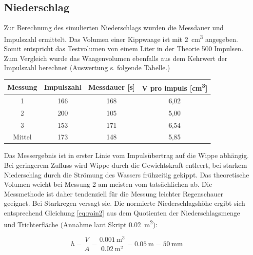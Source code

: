		
\subsection{Niederschlag}
Zur Berechnung des simulierten Niederschlags wurden die Messdauer und Impulszahl ermittelt. Das Volumen einer Kippwaage ist mit \SI{2}{\cubic\centi\meter} angegeben. Somit entspricht das Testvolumen von einem Liter in der Theorie 500 Impulsen. Zum Vergleich wurde das Waagenvolumen ebenfalls aus dem Kehrwert der Impulszahl berechnet (Auswertung s. folgende Tabelle.)

 \begin{center}
 	\begin{tabular}{c|c|c|c}
 		\label{tab:rain}
 		\textbf{Messung} & \textbf{Impulszahl} & \textbf{Messdauer} [s] & \textbf{V pro impuls} [\si{\cubic\centi\meter}]\\
 		\hline
 		1 & 166 & 168  & 6,02\\
 		2 & 200 & 105  & 5,00\\
 		3 & 153 & 171  & 6,54\\
 		Mittel & 173 & 148  & 5,85
 	\end{tabular}
 \end{center}

Das Messergebnis ist in erster Linie vom Impulsübertrag auf die Wippe abhängig. Bei geringerem Zufluss wird Wippe durch die Gewichtskraft entleert, bei starkem Niederschlag durch die Strömung des Wassers frühzeitig gekippt. Das theoretische Volumen weicht bei Messung 2 am meisten vom tatsächlichen ab. Die Messmethode ist daher tendenziell für die Messung leichter Regenschauer geeignet. Bei Starkregen versagt sie. 
Die normierte Niederschlagshöhe ergibt sich entsprechend Gleichung \ref{eq:rain2} aus dem Quotienten der Niederschlagsmenge und Trichterfläche (Annahme laut Skript \SI{0,02}{\square\meter}):

\begin{equation}
	\label{eq:rain2}
	h = \frac{V}{A} = \frac{\SI{0,001}{\cubic\meter}}{\SI{0,02}{\square\meter}} = \SI{0,05}{\meter} = \SI{50}{\milli\meter}
\end{equation}

